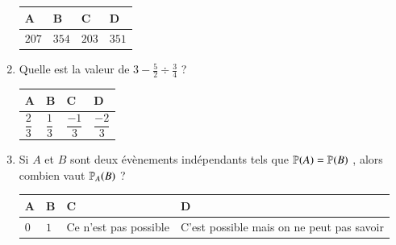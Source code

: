 \documentclass[oneside,12pt]{exam}          %
\begin{document}
\begin{enumerate}[label=\underline{Question \no\arabic*} :  , leftmargin=* , itemsep=4mm]
		\hspace{\linewidth-\textwidth}
		\renewcommand{\arraystretch}{1.5}
		\begin{tabular}{| P{0.22\textwidth} | P{0.22\textwidth} | P{0.22\textwidth} | P{0.22\textwidth} |} \hline
			A & B & C & D \\ \hline
			$207$ & $354$ & $203$ & $351$ \\ \hline
		\end{tabular}
		
		

	\item Quelle est la valeur de $3 - \frac{5}{2} \div \frac{3}{4} $ ?
	
		\hspace{\linewidth-\textwidth}
		\renewcommand{\arraystretch}{1.5}
		\begin{tabular}{| P{0.22\textwidth} | P{0.22\textwidth} | P{0.22\textwidth} | P{0.22\textwidth} |} \hline
			A & B & C & D \\ \hline
			$\dfrac{2}{3}$ & $\dfrac{1}{3}$ & $\dfrac{-1}{3}$ & $\dfrac{-2}{3}$ \\ \hline
		\end{tabular}
		
		

	\item Si $A$ et $B$ sont deux évènements indépendants tels que ${\mathbb P}(A) = {\mathbb P}(B)$ , alors combien vaut ${\mathbb P}_A(B)$ ?
	
		\hspace{\linewidth-\textwidth}
		\renewcommand{\arraystretch}{1.5}
		\begin{tabular}{| P{0.22\textwidth} | P{0.22\textwidth} | P{0.22\textwidth} | P{0.22\textwidth} |} \hline
			A & B & C & D \\ \hline
			$0$ & $1$ & Ce n'est pas possible & C'est possible mais on ne peut pas savoir \\ \hline
		\end{tabular}	
		
\end{enumerate}
\end{document}
